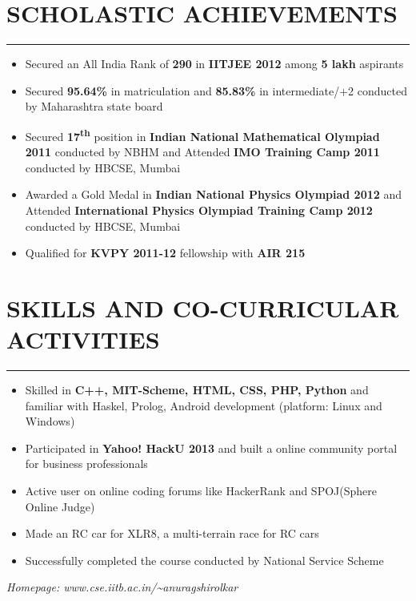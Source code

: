 \documentclass[11pt]{book} %
\begin{document}
\section*{SCHOLASTIC ACHIEVEMENTS}
\vspace{-2mm}
\hrule
\medskip
\begin{itemize}
\itemsep-0.3em
\item Secured an All India Rank of {\bf 290} in {\bf IITJEE 2012} among {\bf 5 lakh} aspirants
\item Secured {\bf 95.64\%} in matriculation and {\bf 85.83\%} in intermediate/+2 conducted by Maharashtra state board
\item Secured {\bf 17\textsuperscript{th}} position in {\bf Indian National Mathematical Olympiad 2011} conducted by NBHM and Attended 
{\bf IMO Training Camp 2011} conducted by HBCSE, Mumbai
\item Awarded a Gold Medal in {\bf Indian National Physics Olympiad 2012} and Attended {\bf International Physics 
Olympiad Training Camp 2012} conducted by HBCSE, Mumbai
\item Qualified for {\bf KVPY 2011-12} fellowship with {\bf AIR 215}
\end{itemize}
\vspace{-8mm}


\section*{SKILLS AND CO-CURRICULAR ACTIVITIES}
\vspace{-2mm}
\hrule
\medskip
\begin{itemize}
\itemsep-0.3em
\item Skilled in \textbf{C++, MIT-Scheme, HTML, CSS, PHP, Python} and familiar with Haskel, Prolog, Android
development (platform: Linux and Windows)
\item Participated in \textbf{Yahoo! HackU 2013} and built a online community portal for business professionals
\item Active user on online coding forums like HackerRank and SPOJ(Sphere Online Judge)
\item Made an RC car for XLR8, a multi-terrain race for RC cars
\item Successfully completed the course conducted by National Service Scheme
\end{itemize}
\textit{Homepage: www.cse.iitb.ac.in/\textasciitilde anuragshirolkar}
\end{document}
